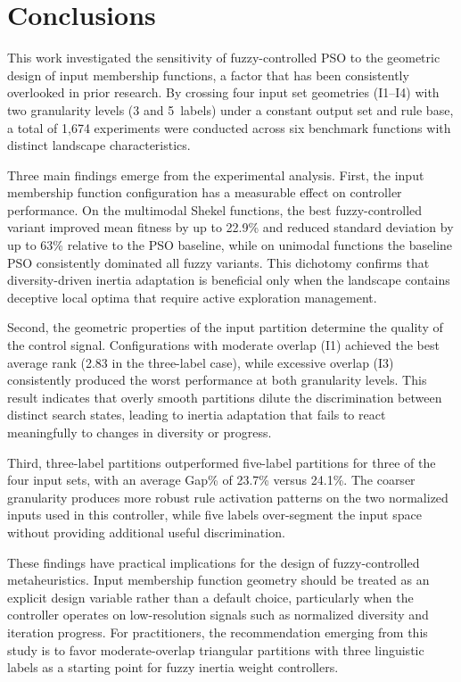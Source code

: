 \section{Conclusions}
\label{sec:conclusions}

This work investigated the sensitivity of fuzzy-controlled PSO to the geometric design of input membership functions, a factor that has been consistently overlooked in prior research. By crossing four input set geometries (I1--I4) with two granularity levels (3 and 5~labels) under a constant output set and rule base, a total of 1,674 experiments were conducted across six benchmark functions with distinct landscape characteristics.

Three main findings emerge from the experimental analysis. First, the input membership function configuration has a measurable effect on controller performance. On the multimodal Shekel functions, the best fuzzy-controlled variant improved mean fitness by up to 22.9\% and reduced standard deviation by up to 63\% relative to the PSO baseline, while on unimodal functions the baseline PSO consistently dominated all fuzzy variants. This dichotomy confirms that diversity-driven inertia adaptation is beneficial only when the landscape contains deceptive local optima that require active exploration management.

Second, the geometric properties of the input partition determine the quality of the control signal. Configurations with moderate overlap (I1) achieved the best average rank (2.83 in the three-label case), while excessive overlap (I3) consistently produced the worst performance at both granularity levels. This result indicates that overly smooth partitions dilute the discrimination between distinct search states, leading to inertia adaptation that fails to react meaningfully to changes in diversity or progress.

Third, three-label partitions outperformed five-label partitions for three of the four input sets, with an average Gap\% of 23.7\% versus 24.1\%. The coarser granularity produces more robust rule activation patterns on the two normalized inputs used in this controller, while five labels over-segment the input space without providing additional useful discrimination.

These findings have practical implications for the design of fuzzy-controlled metaheuristics. Input membership function geometry should be treated as an explicit design variable rather than a default choice, particularly when the controller operates on low-resolution signals such as normalized diversity and iteration progress. For practitioners, the recommendation emerging from this study is to favor moderate-overlap triangular partitions with three linguistic labels as a starting point for fuzzy inertia weight controllers.

